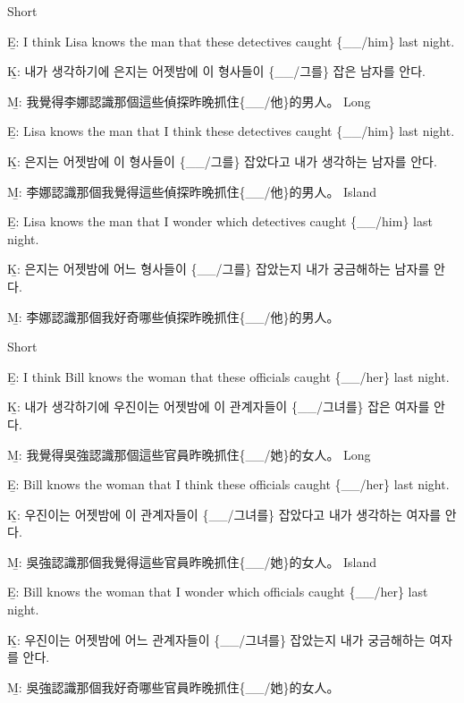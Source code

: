 \pex %
\a Short\par\nobreak
\beginsubsub
\b{E:} I think Lisa knows the man that these detectives caught \{\_\_/him\} last night. \par\nobreak
\b{K:} \ko 내가 생각하기에 은지는 어젯밤에 이 형사들이 \{\_\_/그를\} 잡은 남자를 안다. \normalfont\par\nobreak
\b{M:} \zh 我覺得李娜認識那個這些偵探昨晚抓住\{\_\_/他\}的男人。 \normalfont
\endsubsub
\a Long\par\nobreak
\beginsubsub
\b{E:} Lisa knows the man that I think these detectives caught \{\_\_/him\} last night. \par\nobreak
\b{K:} \ko 은지는 어젯밤에 이 형사들이 \{\_\_/그를\} 잡았다고 내가 생각하는 남자를 안다. \normalfont\par\nobreak
\b{M:} \zh 李娜認識那個我覺得這些偵探昨晚抓住\{\_\_/他\}的男人。 \normalfont
\endsubsub
\a Island\par\nobreak
\beginsubsub
\b{E:} Lisa knows the man that I wonder which detectives caught \{\_\_/him\} last night.\par\nobreak
\b{K:} \ko 은지는 어젯밤에 어느 형사들이 \{\_\_/그를\} 잡았는지 내가 궁금해하는 남자를 안다\normalfont.\par\nobreak
\b{M:} \zh 李娜認識那個我好奇哪些偵探昨晚抓住\{\_\_/他\}的男人。\normalfont
\endsubsub
\xe

\pex %
\a Short\par\nobreak
\beginsubsub
\b{E:} I think Bill knows the woman that these officials caught \{\_\_/her\} last night. \par\nobreak
\b{K:} \ko 내가 생각하기에 우진이는 어젯밤에 이 관계자들이 \{\_\_/그녀를\} 잡은 여자를 안다. \normalfont\par\nobreak
\b{M:} \zh 我覺得吳強認識那個這些官員昨晚抓住\{\_\_/她\}的女人。 \normalfont
\endsubsub
\a Long\par\nobreak
\beginsubsub
\b{E:} Bill knows the woman that I think these officials caught \{\_\_/her\} last night. \par\nobreak
\b{K:} \ko 우진이는 어젯밤에 이 관계자들이 \{\_\_/그녀를\} 잡았다고 내가 생각하는 여자를 안다. \normalfont\par\nobreak
\b{M:} \zh 吳強認識那個我覺得這些官員昨晚抓住\{\_\_/她\}的女人。 \normalfont
\endsubsub
\a Island\par\nobreak
\beginsubsub
\b{E:} Bill knows the woman that I wonder which officials caught \{\_\_/her\} last night.\par\nobreak
\b{K:} \ko 우진이는 어젯밤에 어느 관계자들이 \{\_\_/그녀를\} 잡았는지 내가 궁금해하는 여자를 안다\normalfont.\par\nobreak
\b{M:} \zh 吳強認識那個我好奇哪些官員昨晚抓住\{\_\_/她\}的女人。\normalfont
\endsubsub
\xe

